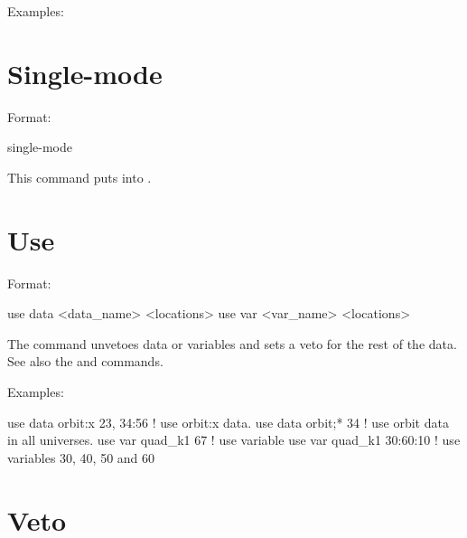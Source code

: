 Examples:

\section{Single-mode}
\label{s:sing}

Format:
\begin{example}
  single-mode
\end{example}

\vskip 0.2in 
This command puts \tao into . 

\section{Use}
\label{s:use}

Format:
\begin{example}
  use data  <data_name> <locations>
  use var <var_name> <locations>
\end{example}

\vskip 0.2in 
The  command unvetoes data or variables and sets a veto for
the rest of the data. See also the  and 
commands.

Examples:
\begin{example}
  use data orbit:x  23, 34:56  ! use orbit:x data.
  use data orbit;* 34          ! use orbit data in all universes.
  use var quad_k1 67           ! use variable
  use var quad_k1 30:60:10     ! use variables 30, 40, 50 and 60
\end{example}


\section{Veto}
\label{s:veto}

